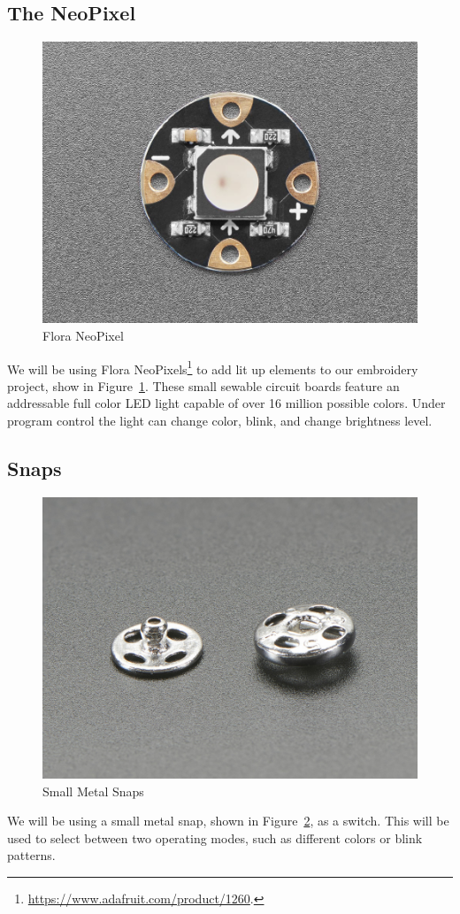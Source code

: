 \documentclass[letterpaper,twoside,12pt]{article}
\begin{document}
\subsection{The NeoPixel}
\begin{figure}[hbpt]\begin{centering}%
\includegraphics[width=5in]{FloraNeoPixel.jpg}
\caption{Flora NeoPixel}
\label{fig:floraneopixel}
\end{centering}\end{figure}
We will be using Flora
NeoPixels\footnote{\url{https://www.adafruit.com/product/1260}.} to add lit up
elements to our embroidery project, show in Figure~\ref{fig:floraneopixel}.
These small sewable circuit boards feature an addressable full color LED light
capable of over 16 million possible colors.  Under program control the light 
can change color, blink, and change brightness level.
\clearpage
\subsection{Snaps}
\begin{figure}[hbpt]\begin{centering}%
\includegraphics[width=5in]{snap.jpg}
\caption{Small Metal Snaps}
\label{fig:snaps}
\end{centering}\end{figure}
We will be using a small metal snap, shown in Figure~\ref{fig:snaps}, as a 
switch.  This will be used to select between two operating modes, such as
different colors or blink patterns.
\clearpage
\end{document}
